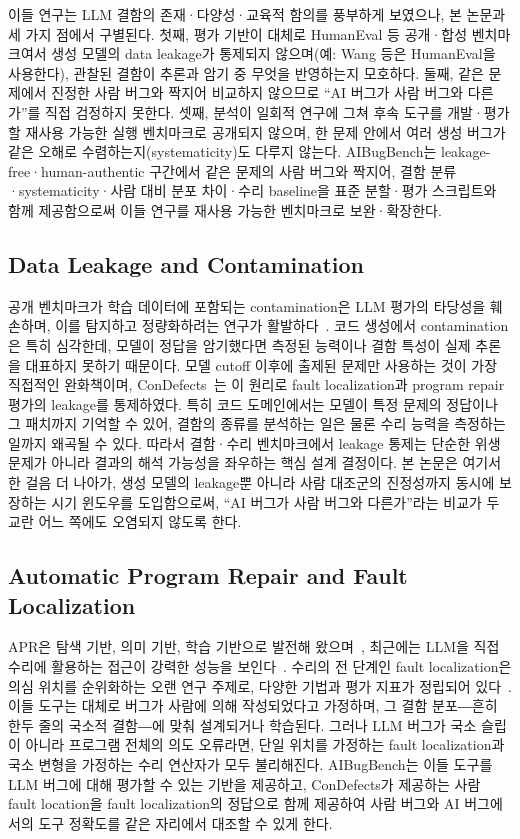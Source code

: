 \documentclass[10pt,conference]{IEEEtran}
\begin{document}
이들 연구는 LLM 결함의 존재·다양성·교육적 함의를 풍부하게 보였으나, 본 논문과 세 가지 점에서 구별된다. 첫째, 평가 기반이 대체로 HumanEval 등 공개·합성 벤치마크여서 생성 모델의 data leakage가 통제되지 않으며(예: Wang 등은 HumanEval을 사용한다), 관찰된 결함이 추론과 암기 중 무엇을 반영하는지 모호하다. 둘째, 같은 문제에서 진정한 사람 버그와 짝지어 비교하지 않으므로 ``AI 버그가 사람 버그와 다른가''를 직접 검정하지 못한다. 셋째, 분석이 일회적 연구에 그쳐 후속 도구를 개발·평가할 재사용 가능한 실행 벤치마크로 공개되지 않으며, 한 문제 안에서 여러 생성 버그가 같은 오해로 수렴하는지(systematicity)도 다루지 않는다. AIBugBench는 leakage-free·human-authentic 구간에서 같은 문제의 사람 버그와 짝지어, 결함 분류·systematicity·사람 대비 분포 차이·수리 baseline을 표준 분할·평가 스크립트와 함께 제공함으로써 이들 연구를 재사용 가능한 벤치마크로 보완·확장한다.

\subsection{Data Leakage and Contamination}
공개 벤치마크가 학습 데이터에 포함되는 contamination은 LLM 평가의 타당성을 훼손하며, 이를 탐지하고 정량화하려는 연구가 활발하다~\cite{golchin2024contamination}. 코드 생성에서 contamination은 특히 심각한데, 모델이 정답을 암기했다면 측정된 능력이나 결함 특성이 실제 추론을 대표하지 못하기 때문이다. 모델 cutoff 이후에 출제된 문제만 사용하는 것이 가장 직접적인 완화책이며, ConDefects~\cite{wu2023condefects}는 이 원리로 fault localization과 program repair 평가의 leakage를 통제하였다. 특히 코드 도메인에서는 모델이 특정 문제의 정답이나 그 패치까지 기억할 수 있어, 결함의 종류를 분석하는 일은 물론 수리 능력을 측정하는 일까지 왜곡될 수 있다. 따라서 결함·수리 벤치마크에서 leakage 통제는 단순한 위생 문제가 아니라 결과의 해석 가능성을 좌우하는 핵심 설계 결정이다. 본 논문은 여기서 한 걸음 더 나아가, 생성 모델의 leakage뿐 아니라 사람 대조군의 진정성까지 동시에 보장하는 시기 윈도우를 도입함으로써, ``AI 버그가 사람 버그와 다른가''라는 비교가 두 교란 어느 쪽에도 오염되지 않도록 한다.

\subsection{Automatic Program Repair and Fault Localization}
APR은 탐색 기반, 의미 기반, 학습 기반으로 발전해 왔으며~\cite{monperrus2018survey}, 최근에는 LLM을 직접 수리에 활용하는 접근이 강력한 성능을 보인다~\cite{xia2023llmapr}. 수리의 전 단계인 fault localization은 의심 위치를 순위화하는 오랜 연구 주제로, 다양한 기법과 평가 지표가 정립되어 있다~\cite{wong2016flsurvey}. 이들 도구는 대체로 버그가 사람에 의해 작성되었다고 가정하며, 그 결함 분포―흔히 한두 줄의 국소적 결함―에 맞춰 설계되거나 학습된다. 그러나 LLM 버그가 국소 슬립이 아니라 프로그램 전체의 의도 오류라면, 단일 위치를 가정하는 fault localization과 국소 변형을 가정하는 수리 연산자가 모두 불리해진다. AIBugBench는 이들 도구를 LLM 버그에 대해 평가할 수 있는 기반을 제공하고, ConDefects가 제공하는 사람 fault location을 fault localization의 정답으로 함께 제공하여 사람 버그와 AI 버그에서의 도구 정확도를 같은 자리에서 대조할 수 있게 한다.
\end{document}
